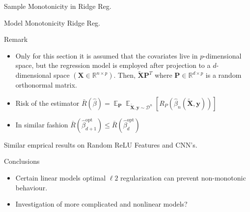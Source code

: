 \documentclass[aspectratio=169]{beamer}
\begin{document}
\begin{frame}{Sample Monotonicity in Ridge Reg.}
\end{frame}

\begin{frame}{Model Monotonicity Ridge Reg.}
\begin{block}{\color{White}Remark}
\begin{itemize}
  \item Only for this section it is assumed that the covariates live in $p$-dimensional space, but the regression model is employed after projection to a $d$-dimensional space $(\boldsymbol{X}\in\mathbb{R}^{n\times p})$. Then, $\tilde{\boldsymbol{X}}\boldsymbol{P}^T$ where $\boldsymbol{P}\in\mathbb{R}^{d\times p}$ is a random orthonormal matrix.
\end{itemize}
\end{block}

\begin{itemize}
  \item Risk of the estimator $\bar{R}(\hat{\beta}) = \displaystyle\mathop{\mathbb{E}}_{\boldsymbol{P}}\mathop{\mathbb{E}}_{\tilde{\boldsymbol{X}},\boldsymbol{y}\sim \mathcal{D}^n}[R_P(\hat{\beta}_n(\tilde{\boldsymbol{X}},\boldsymbol{y}))]$
  \item In similar fashion $\bar{R}(\hat{\beta}^{\text{opt}}_{d+1})\leq \bar{R}(\hat{\beta}^{\text{opt}}_{d})$
\end{itemize}

\end{frame}

\begin{frame}
  Similar emprical results on Random ReLU Features and CNN's.
\end{frame}

\begin{frame}{Conclusions}
\begin{itemize}
  \item Certain linear models optimal $\ell2$ regularization can prevent non-monotonic behaviour.
  \item Investigation of more complicated and nonlinear models?
\end{itemize}
  
\end{frame}
\end{document}
